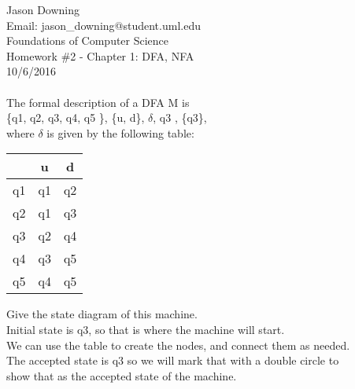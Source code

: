 \documentclass[12pt]{article}
\begin{document}
\noindent
Jason Downing \\
Email: jason\_downing@student.uml.edu \\
Foundations of Computer Science \\
Homework \#2 - Chapter 1: DFA, NFA\\
10/6/2016 \\

 \\
The formal description of a DFA M is \\
\{q1, q2, q3, q4, q5 \}, \{u, d\}, $\delta$, q3 , \{q3\}, \\
where $\delta$  is given by the following table:
\begin{center}
\begin{tabular}{ c | c c }
 & u & d \\
\hline
 q1 & q1 & q2 \\ 
 q2 & q1 & q3 \\  
 q3 & q2 & q4 \\
 q4 & q3 & q5 \\
 q5 & q4 & q5
\end{tabular}
\end{center}

\noindent
Give the state diagram of this machine.	\\

\noindent
Initial state is q3, so that is where the machine will start. \\
We can use the table to create the nodes, and connect them as needed. \\
The accepted state is q3 so we will mark that with a double circle to \\
show that as the accepted state of the machine. \\

\begin{center}
 \\
\end{center}
\end{document}
